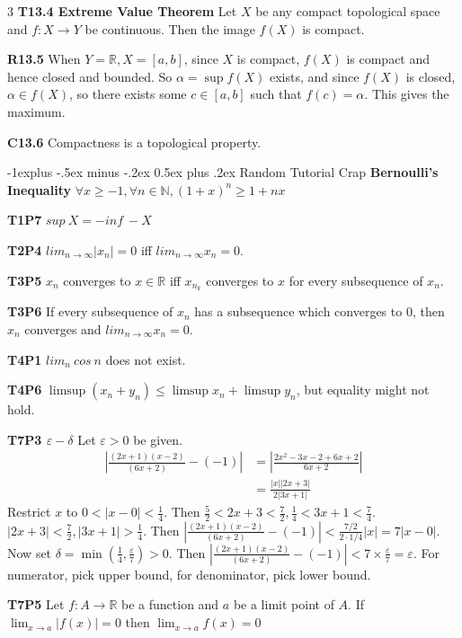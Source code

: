 \documentclass[10pt, landscape]{article}
\makeatletter
\renewcommand{\section}{\@startsection{section}{1}{0mm}%
                                {-1ex plus -.5ex minus -.2ex}%
                                {0.5ex plus .2ex}%
                                {\normalfont\large\bfseries}}
\renewcommand{\section}{\@startsection{section}{2}{0mm}%
                                {-1explus -.5ex minus -.2ex}%
                                {0.5ex plus .2ex}%
                                {\normalfont\normalsize\bfseries}}
\makeatother
\begin{document}
\begin{multicols*}{3}
\textbf{T13.4 Extreme Value Theorem} Let $X$ be any compact topological space and $f: X \rightarrow Y$ be continuous. Then the image $f(X)$ is compact.

\textbf{R13.5} When $Y= \mathbb{R}, X=[a,b]$, since $X$ is compact, $f(X)$ is compact and hence closed and bounded. So $\alpha = \sup f(X)$ exists, and since $f(X)$ is closed, $\alpha \in f(X)$, so there exists some $c \in [a, b]$ such that $f(c)=\alpha$. This gives the maximum.

\textbf{C13.6} Compactness is a topological property.

\section{Random Tutorial Crap}
\textbf{Bernoulli's Inequality} $\forall x \geq -1, \forall n \in \mathbb{N}, (1+x)^n \geq 1+nx$

\textbf{T1P7} $sup\ X = - inf\ -X$

\textbf{T2P4} $lim_{n\rightarrow\infty}|x_n|=0$ iff $lim_{n \rightarrow\infty}x_n=0$.

\textbf{T3P5} $x_n$ converges to $x \in \mathbb{R}$ iff $x_{n_k}$ converges to $x$ for every subsequence of $x_n$.

\textbf{T3P6} If every subsequence of $x_n$ has a subsequence which converges to $0$, then $x_n$ converges and $lim_{n\rightarrow\infty}x_n=0$.

\textbf{T4P1} $lim_n\ cos\ n$ does not exist.

\textbf{T4P6} $\limsup (x_n+y_n) \leq \limsup x_n + \limsup y_n$, but equality might not hold.

\textbf{T7P3 $\varepsilon-\delta$} Let $\varepsilon > 0$ be given.
\begin{align*}
|\frac{(2x+1)(x-2)}{(6x+2)}-(-1)|&=|\frac{2x^2-3x-2+6x+2}{6x+2}|\\
&=\frac{|x||2x+3|}{2|3x+1|}
\end{align*}
Restrict $x$ to $0 < |x-0| < \frac{1}{4}$. Then $\frac{5}{2}<2x+3<\frac{7}{2}, \frac{1}{4}<3x+1<\frac{7}{4}$. $|2x+3| < \frac{7}{2}, |3x+1|>\frac{1}{4}$. Then $|\frac{(2x+1)(x-2)}{(6x+2)}-(-1)| < \frac{7/2}{2\cdot1/4}|x|=7|x-0|$. Now set $\delta=\min(\frac{1}{4}, \frac{\varepsilon}{7}) > 0$. Then $|\frac{(2x+1)(x-2)}{(6x+2)}-(-1)|< 7 \times \frac{\varepsilon}{7} = \varepsilon$. For numerator, pick upper bound, for denominator, pick lower bound.

\textbf{T7P5} Let $f: A \rightarrow \mathbb{R}$ be a function and $a$ be a limit point of $A$. If $\lim_{x \rightarrow a}|f(x)|=0$ then $\lim_{x \rightarrow a}f(x)=0$


\end{multicols*}
\end{document}
